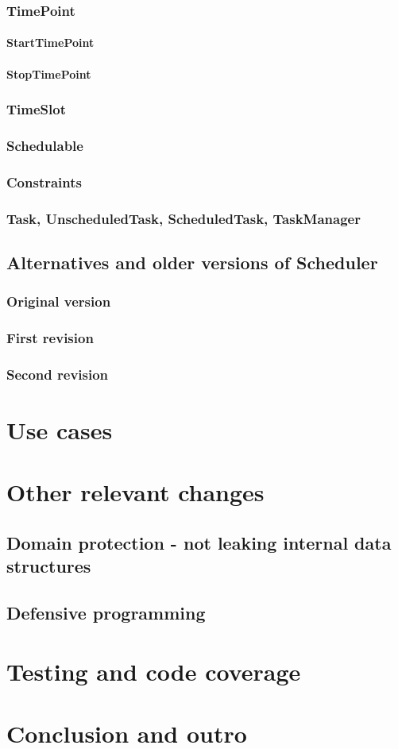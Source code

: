 \documentclass[11pt]{article}
\begin{document}
\subsubsection{TimePoint}
\paragraph{StartTimePoint}
\paragraph{StopTimePoint}
\subsubsection{TimeSlot}
\subsubsection{Schedulable}
\subsubsection{Constraints}
\subsubsection{Task, UnscheduledTask, ScheduledTask, TaskManager}
\subsection{Alternatives and older versions of Scheduler}
\subsubsection{Original version}
\subsubsection{First revision}
\subsubsection{Second revision}
\section{Use cases}
\section{Other relevant changes}
\subsection{Domain protection - not leaking internal data structures}
\subsection{Defensive programming}
\section{Testing and code coverage}
\section{Conclusion and outro}
\end{document}
